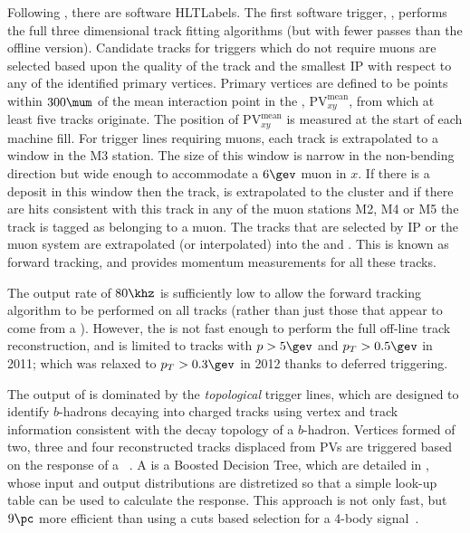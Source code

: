 Following \lone, there are software \glspl{HLTLabel}.
The first software trigger, \hltone, performs the full three dimensional \velo track fitting
algorithms (but with fewer passes than the offline version).
Candidate \velo tracks for triggers which do not require muons are selected based upon the quality of the
\velo track and the smallest IP with respect to any of the identified primary vertices.
Primary vertices are defined to be points within $300\mum$ of the mean
interaction point in the , $\mathrm{PV}^\mathrm{mean}_{xy}$, from which at least five
tracks originate.
The position of $\mathrm{PV}^\mathrm{mean}_{xy}$ is measured at the start of each \lhc machine
fill.
For trigger lines requiring muons, each \velo track is extrapolated to a window in the M3
station.
The size of this window is narrow in the non-bending direction but wide enough to accommodate a $6\gev$
muon in $x$.
If there is a deposit in this window then the \velo track, is extrapolated to the cluster and if
there are hits consistent with this track in any of the muon stations M2, M4 or M5 the track is
tagged as belonging to a muon.
The \velo tracks that are selected by IP or the muon system are extrapolated (or interpolated) into
the \intr and \ot.
This is known as forward tracking, and provides momentum measurements for all these tracks.


The \hltone output rate of $80\khz$ is sufficiently low to allow the forward tracking algorithm to
be performed on all \velo tracks (rather than just those that appear to come from a \pv).
However, the \hlttwo is not fast enough to perform the full off-line track reconstruction, and
is limited to \velo tracks with
$p>5\gev$ and $p_T>0.5\gev$ in 2011; which was relaxed to $p_T>0.3\gev$ in 2012 thanks to deferred
triggering.

The output of \hlttwo is dominated by the \emph{topological} trigger lines, which are designed to
identify $b$-hadrons decaying into charged tracks using vertex and track information consistent
with the decay topology of a $b$-hadron.
Vertices formed of two, three and four reconstructed tracks displaced from \glspl{PV} are triggered
based on the response of a \BBDT~\cite{Gligorov:2012qt}.
A \BBDT is a Boosted Decision Tree, which are detailed in , whose input and output
distributions are distretized so that a simple look-up table can be used to calculate the response.
This approach is not only fast, but $9\pc$ more efficient than using a cuts based selection for a
4-body signal~\cite{Gligorov:2012qt}.


